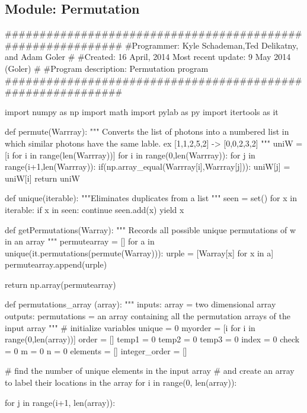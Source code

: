 \documentclass[11pt,a4paper,notitlepage]{article}
\begin{document}
\subsection{Module: Permutation}

\begin{code}
############################################################
#Programmer: Kyle Schademan,Ted Delikatny, and Adam Goler
# 
#Created: 16 April, 2014 Most recent update:  9 May 2014 (Goler)
# 
#Program description: Permutation program 
############################################################ 
  
import numpy as np 
import math 
import pylab as py
import itertools as it
  

def permute(Warrray):
    """ Converts the list of photons into a numbered list in which similar photons have the same lable. ex [1,1,2,5,2] -> [0,0,2,3,2] """
    uniW = [i for i in range(len(Warrray))]
    for i in range(0,len(Warrray)):
        for j in range(i+1,len(Warrray)):
            if(np.array_equal(Warrray[i],Warrray[j])):
                uniW[j] = uniW[i]
    return uniW

def unique(iterable):
    """Eliminates duplicates from a list """
    seen = set()
    for x in iterable:
        if x in seen:
            continue
        seen.add(x)
        yield x


def getPermutations(Warray):
    """ Records all possible unique permutations of w in an array """
    permutearray = []
    for a in unique(it.permutations(permute(Warray))):
        urple = [Warray[x] for x in a]
        permutearray.append(urple)

    
    return np.array(permutearray)


def permutations_array (array):
    """ 
    inputs: 
        array = two dimensional array 
    outputs: 
        permutations = an array containing all the permutation  
            arrays of the input array 
    """
    # initialize variables 
    unique = 0 
    myorder = [i for i in range(0,len(array))] 
    order = [] 
    temp1 = 0
    temp2 = 0
    temp3 = 0
    index = 0  
    check = 0 
    m = 0
    n = 0
    elements = []  
    integer_order = [] 
              
    # find the number of unique elements in the input array 
    # and create an array to label their locations in the array
    for i in range(0, len(array)): 
          
        for j in range(i+1, len(array)): 
              

\end{code}
\end{document}
